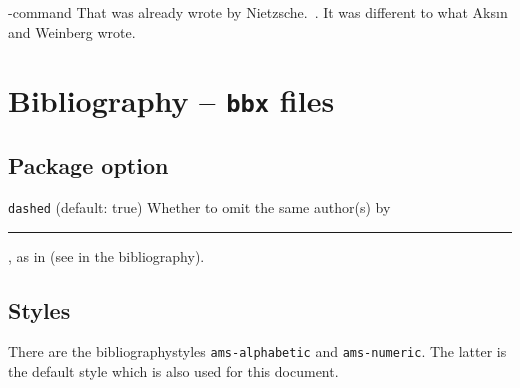 \documentclass{article}
\begin{document}
\begin{exampleM}%
{-command}
That was already wrote by Nietzsche.~\parencite[p.\,23]{nietzsche:ksa}. It was different to what Aks{\i}n and Weinberg wrote.~\cite{aksin,weinberg}
\end{exampleM}


\section{Bibliography -- \texttt{bbx} files}
\subsection{Package option}

%

\verb|dashed| (default: true) Whether to omit the same author(s) by \rule{1.5em}{0.4pt}, 
as in  (see \textcite{nietzsche:ksa1} in the bibliography).

\subsection{Styles}
There are the bibliographystyles \texttt{ams-alphabetic} and \texttt{ams-numeric}.
The latter is the default style which is also used for this document.


\printbibliography
	
\end{document}
